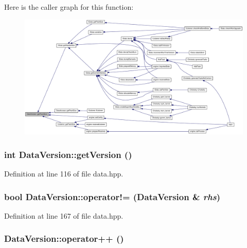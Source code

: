 Here is the caller graph for this function:\nopagebreak
\begin{figure}[H]
\begin{center}
\leavevmode
\includegraphics[width=420pt]{struct_data_version_a77899e6e8255693a00a56250c2d26572_icgraph}
\end{center}
\end{figure}
\hypertarget{struct_data_version_a7d857b2f8fc3f8cee37955f40940daf7}{
\subsubsection[{getVersion}]{\setlength{\rightskip}{0pt plus 5cm}int DataVersion::getVersion ()}}
\label{struct_data_version_a7d857b2f8fc3f8cee37955f40940daf7}


Definition at line 116 of file data.hpp.\hypertarget{struct_data_version_afcf7bba215d28dfd7dec5018aeb5057a}{
\subsubsection[{operator!=}]{\setlength{\rightskip}{0pt plus 5cm}bool DataVersion::operator!= ({\bf DataVersion} \& {\em rhs})}}
\label{struct_data_version_afcf7bba215d28dfd7dec5018aeb5057a}


Definition at line 167 of file data.hpp.\hypertarget{struct_data_version_ac90719117093b35fe7ad1cf98bcfc630}{
\subsubsection[{operator++}]{ DataVersion::operator++ ()}}
\label{struct_data_version_ac90719117093b35fe7ad1cf98bcfc630}


